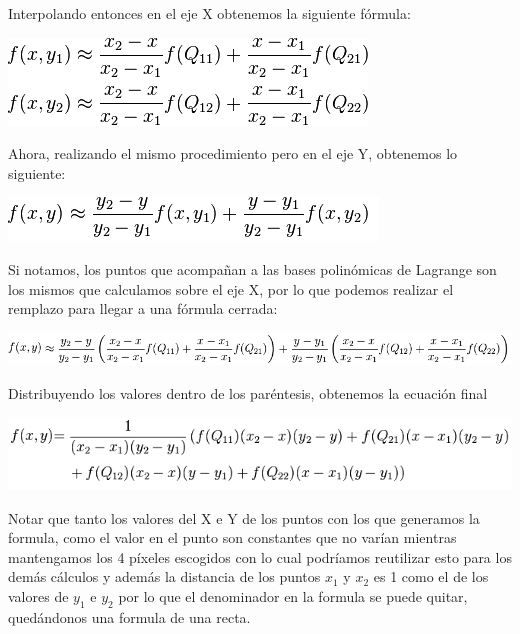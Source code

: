 Interpolando entonces en el eje X obtenemos la siguiente fórmula:

\begin{center}
\includegraphics[scale=0.75]{imagenes/bilinealX.png}\\
\end{center}


Ahora, realizando el mismo procedimiento pero en el eje Y, obtenemos lo siguiente:

\begin{center}
\includegraphics[scale=0.75]{imagenes/bilinealY.png}\\
\end{center}

Si notamos, los puntos que acompañan a las bases polinómicas de Lagrange son los mismos que calculamos sobre el eje X, por lo que podemos realizar el remplazo para llegar a una fórmula cerrada:

\begin{center}
\includegraphics[scale=0.75]{imagenes/bilinealXY.png}\\
\end{center}

Distribuyendo los valores dentro de los paréntesis, obtenemos la ecuación final

\begin{center}
\includegraphics[scale=0.75]{imagenes/bilinealFinal.png}\\
\end{center}

Notar que tanto los valores del X e Y de los puntos con los que generamos la formula, como el valor en el punto son constantes que no varían mientras mantengamos los 4 píxeles escogidos con lo cual podríamos reutilizar esto para los demás cálculos y además la distancia de los puntos $x_1$ y $x_2$ es 1 como el de los valores de $y_1$ e $y_2$ por lo que el denominador en la formula se puede quitar, quedándonos una formula de una recta. 


